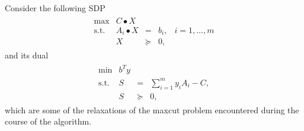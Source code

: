 \documentclass[12pt]{article}
\begin{document}
Consider the following SDP
\begin{eqnarray}
\label{sdp_relax}
\begin{array}{lrccc}
\max & C \bullet X \\
\mbox{s.t.} & A_i \bullet X & = & b_i, & i=1,\ldots,m \\
& X & \succeq & 0,
\end{array}
\end{eqnarray}
and its dual
\begin{eqnarray}
\label{sdd_relax}
\begin{array}{lrcc}
\min & b^Ty \\
\mbox{s.t.} & S & = & \displaystyle \sum_{i=1}^my_iA_i - C, \\
& S & \succeq & 0,
\end{array}
\end{eqnarray}
which are some of the relaxations of the maxcut problem
encountered during the course of the algorithm.
\end{document}
